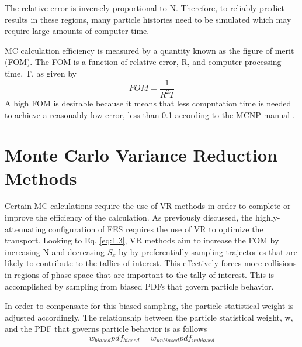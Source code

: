 The relative error is inversely proportional to N.
Therefore, to reliably predict results in these regions, many particle
histories need to be simulated which may require large amounts of computer time.


MC calculation efficiency is measured by a quantity known as the figure of merit
(FOM).  The FOM is a function of relative error, R, and computer processing
time, T, 
as given by
\begin{equation} \label{eq:1.3}
		FOM = \frac{1}{{{R^2}T}}
\end{equation}
A high FOM is desirable because it means that less computation time is needed to achieve
a reasonably low error, less than 0.1 according to the MCNP manual \cite{mcnp_manual}. 



\section{Monte Carlo Variance Reduction Methods}\label{sec:vr_methods}

Certain MC calculations require the use of VR methods in order
to complete or improve the efficiency of the calculation. As previously
discussed, the highly-attenuating configuration of FES requires the use of
VR to optimize the transport.
Looking to Eq. \ref{eq:1.3}, VR methods aim to increase the FOM by increasing N and decreasing 
$S_{\overline{x}}$ by by preferentially sampling trajectories that are likely to
contribute to the tallies of interest.
This effectively forces more collisions in regions of phase space that are
important to the tally of interest. 
This is accomplished by sampling from biased PDFs that govern particle behavior. 

In order to compensate for this biased sampling, the particle statistical weight
is adjusted accordingly.
The relationship between the particle statistical weight, w, and the PDF that
governs particle behavior is as follows
\begin{equation} \label{eq:2.1}
		w_{biased} pdf_{biased} = w_{unbiased} pdf_{unbiased}
\end{equation}


